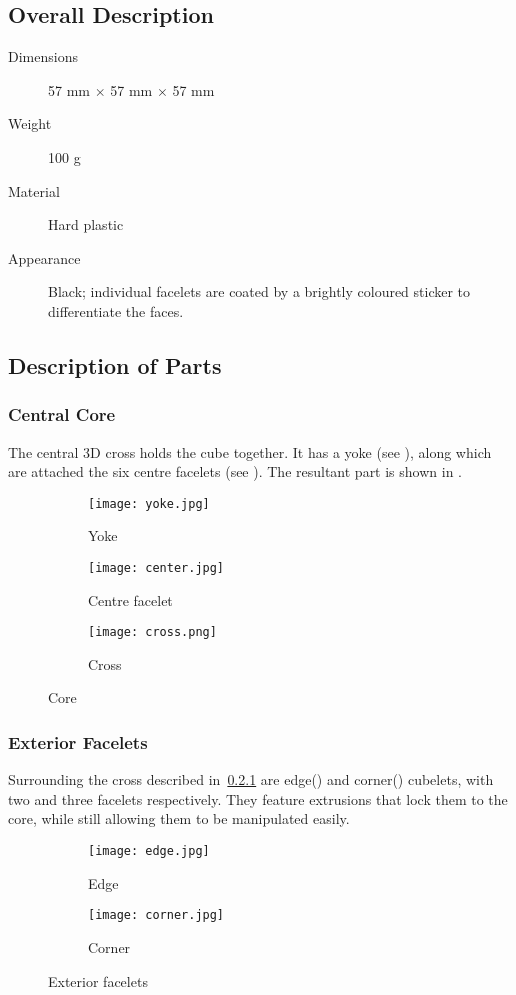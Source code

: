 \subsection{Overall Description}
\begin{description}
	\item[Dimensions] 57 mm ${\times}$ 57 mm ${\times}$ 57 mm
	\item[Weight]	100 g
	\item[Material] Hard plastic
	\item[Appearance] Black; individual facelets are coated by a brightly coloured sticker to differentiate the faces.
\end{description}
\subsection{Description of Parts}
	\subsubsection{Central Core}\label{part:cross}
		The central 3D cross holds the cube together. It has a yoke (see ), along which are attached the six centre facelets (see ). The resultant part is shown in .
		\begin{figure}[h]
			\centering
			\begin{subfigure}[b]{0.3\textwidth}
				\texttt{[image: yoke.jpg]}
				\caption{Yoke}\label{fig:yoke}
			\end{subfigure}
			\begin{subfigure}[b]{0.3\textwidth}
				\texttt{[image: center.jpg]}
				\caption{Centre facelet}\label{fig:centre}
			\end{subfigure}
			\begin{subfigure}[b]{0.3\textwidth}
				\texttt{[image: cross.png]}
				\caption{Cross}\label{fig:cross}
			\end{subfigure}
			\caption{Core}
		\end{figure}
	\subsubsection{Exterior Facelets}
		Surrounding the cross described in~\ref{part:cross} are edge() and corner() cubelets, with two and three facelets respectively. They feature extrusions that lock them to the core, while still allowing them to be manipulated easily.
		\begin{figure}[h]
			\centering
			\begin{subfigure}[b]{0.4\textwidth}
				\texttt{[image: edge.jpg]}
				\caption{Edge}\label{fig:edge}
			\end{subfigure}
			\begin{subfigure}[b]{0.4\textwidth}
				\texttt{[image: corner.jpg]}
				\caption{Corner}\label{fig:corner}
			\end{subfigure}
			\caption{Exterior facelets}
		\end{figure}